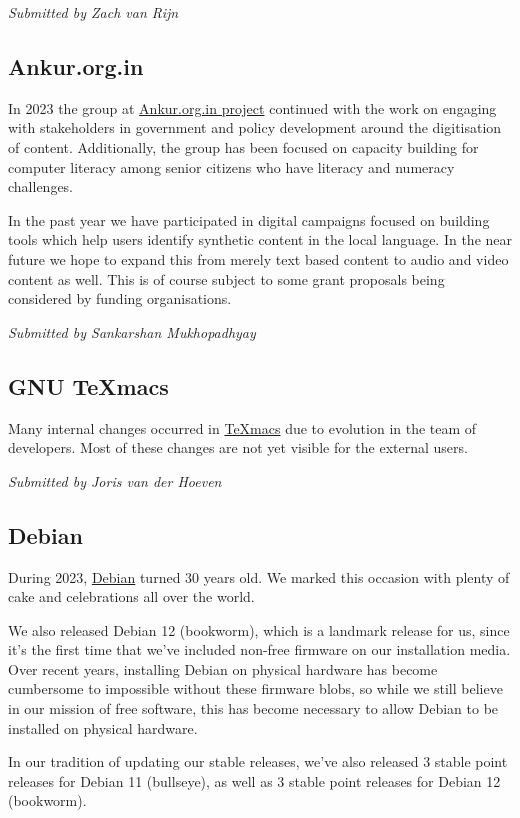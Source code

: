 \documentclass[a4paper]{report}
\begin{document}
{\em Submitted by Zach van Rijn}

\subsection{Ankur.org.in}

In 2023 the group at \href{http://ankur.org.in/}{Ankur.org.in project} continued with the work on engaging with stakeholders in government and policy development around the digitisation of content. Additionally, the group has been focused on capacity building for computer literacy among senior citizens who have literacy and numeracy challenges.

In the past year we have participated in digital campaigns focused on building tools which help users identify synthetic content in the local language. In the near future we hope to expand this from merely text based content to audio and video content as well. This is of course subject to some grant proposals being considered by funding organisations.

{\em Submitted by Sankarshan Mukhopadhyay}

\subsection{GNU TeXmacs}

Many internal changes occurred in \href{https://www.texmacs.org/}{TeXmacs} due to evolution in the team of developers.  Most of these changes are not yet visible for the external users.

{\em Submitted by Joris van der Hoeven}

\subsection{Debian}

During 2023, \href{https://www.debian.org/}{Debian} turned 30 years old. We marked this occasion with plenty of cake and celebrations all over the world.

We also released Debian 12 (bookworm), which is a landmark release for us, since it's the first time that we've included non-free firmware on our installation media. Over recent years, installing Debian on physical hardware has become cumbersome to impossible without these firmware blobs, so while we still believe in our mission of free software, this has become necessary to allow Debian to be installed on physical hardware.

In our tradition of updating our stable releases, we've also released 3 stable point releases for Debian 11 (bullseye), as well as 3 stable point releases for Debian 12 (bookworm).
\end{document}
